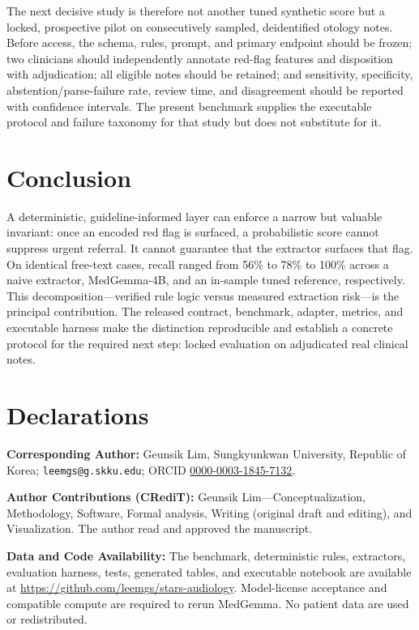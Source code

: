 \documentclass[11pt]{article}
\begin{document}
The next decisive study is therefore not another tuned synthetic score but a locked, prospective pilot on consecutively sampled, deidentified otology notes. Before access, the schema, rules, prompt, and primary endpoint should be frozen; two clinicians should independently annotate red-flag features and disposition with adjudication; all eligible notes should be retained; and sensitivity, specificity, abstention/parse-failure rate, review time, and disagreement should be reported with confidence intervals. The present benchmark supplies the executable protocol and failure taxonomy for that study but does not substitute for it.

\section{Conclusion}
A deterministic, guideline-informed layer can enforce a narrow but valuable invariant: once an encoded red flag is surfaced, a probabilistic score cannot suppress urgent referral. It cannot guarantee that the extractor surfaces that flag. On identical free-text cases, recall ranged from 56\% to 78\% to 100\% across a naive extractor, MedGemma-4B, and an in-sample tuned reference, respectively. This decomposition---verified rule logic versus measured extraction risk---is the principal contribution. The released contract, benchmark, adapter, metrics, and executable harness make the distinction reproducible and establish a concrete protocol for the required next step: locked evaluation on adjudicated real clinical notes.

\section*{Declarations}
\noindent\textbf{Corresponding Author:} Geunsik Lim, Sungkyunkwan University, Republic of Korea; \texttt{leemgs@\allowbreak g.skku.edu}; ORCID \href{https://orcid.org/0000-0003-1845-7132}{0000-0003-1845-7132}.

\noindent\textbf{Author Contributions (CRediT):} Geunsik Lim---Conceptualization, Methodology, Software, Formal analysis, Writing (original draft and editing), and Visualization. The author read and approved the manuscript.

\noindent\textbf{Data and Code Availability:} The benchmark, deterministic rules, extractors, evaluation harness, tests, generated tables, and executable notebook are available at \url{https://github.com/leemgs/stars-audiology}. Model-license acceptance and compatible compute are required to rerun MedGemma. No patient data are used or redistributed.
\end{document}
